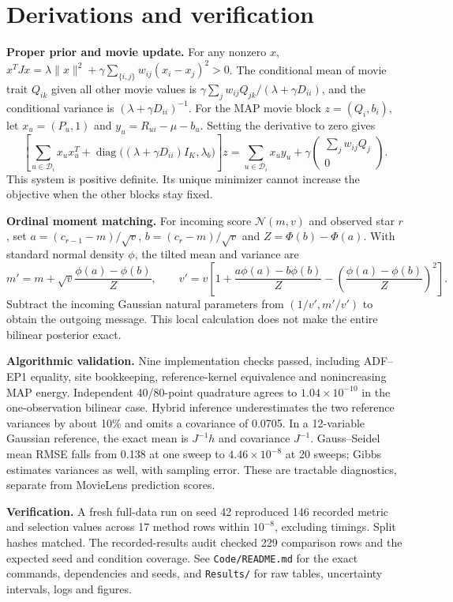 \documentclass[11pt,a4paper]{article}
\newcommand{\N}{\mathcal N}
\begin{document}



\clearpage
\appendix
\section{Derivations and verification}
\textbf{Proper prior and movie update.}
For any nonzero $x$,
$x^TJx=\lambda\|x\|^2+\gamma\sum_{\{i,j\}}w_{ij}(x_i-x_j)^2>0$.
The conditional mean of movie trait $Q_{ik}$ given all other movie values
is $\gamma\sum_j w_{ij}Q_{jk}/(\lambda+\gamma D_{ii})$, and the
conditional variance is $(\lambda+\gamma D_{ii})^{-1}$.
For the MAP movie block $z=(Q_i,b_i)$, let $x_u=(P_u,1)$ and
$y_u=R_{ui}-\mu-b_u$. Setting the derivative to zero gives
\[
\left[\sum_{u\in\mathcal D_i}x_ux_u^T+
\operatorname{diag}\big((\lambda+\gamma D_{ii})I_K,\lambda_b\big)\right]z
=\sum_{u\in\mathcal D_i}x_u y_u+
\gamma\begin{pmatrix}\sum_j w_{ij}Q_j\\0\end{pmatrix}.
\]
This system is positive definite. Its unique minimizer cannot increase
the objective when the other blocks stay fixed.

\textbf{Ordinal moment matching.}
For incoming score $\N(m,v)$ and observed star $r$, set
$a=(c_{r-1}-m)/\sqrt v$, $b=(c_r-m)/\sqrt v$ and
$Z=\Phi(b)-\Phi(a)$. With standard normal density $\phi$, the tilted mean
and variance are
\[
m'=m+\sqrt v\frac{\phi(a)-\phi(b)}Z,\qquad
v'=v\left[1+\frac{a\phi(a)-b\phi(b)}Z-
\left(\frac{\phi(a)-\phi(b)}Z\right)^2\right].
\]
Subtract the incoming Gaussian natural parameters from $(1/v',m'/v')$
to obtain the outgoing message. This local calculation does not make
the entire bilinear posterior exact.

\textbf{Algorithmic validation.}
Nine implementation checks passed, including ADF--EP1 equality, site
bookkeeping, reference-kernel equivalence and nonincreasing MAP energy.
Independent 40/80-point quadrature agrees to $1.04\times10^{-10}$ in the
one-observation bilinear case. Hybrid inference underestimates the two
reference variances by about 10\% and omits a covariance of 0.0705.
In a 12-variable Gaussian reference, the exact mean is $J^{-1}h$ and
covariance $J^{-1}$. Gauss--Seidel mean RMSE falls from 0.138 at one
sweep to $4.46\times10^{-8}$ at 20 sweeps; Gibbs estimates variances
as well, with sampling error. These are tractable diagnostics, separate
from MovieLens prediction scores.

\textbf{Verification.}
A fresh full-data run on seed 42 reproduced 146 recorded metric and
selection values across 17 method rows within $10^{-8}$, excluding
timings. Split hashes matched. The recorded-results audit checked 229
comparison rows and the expected seed and condition coverage. See
\texttt{Code/README.md} for the exact commands, dependencies and seeds,
and \texttt{Results/} for raw tables, uncertainty intervals, logs and figures.
\end{document}
